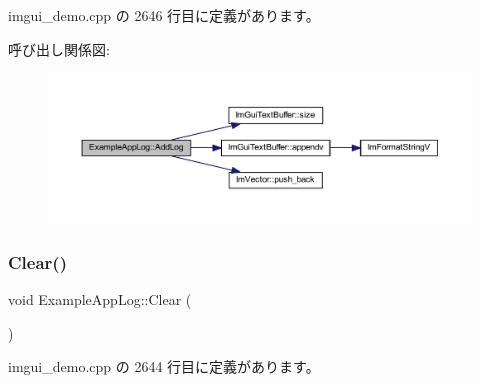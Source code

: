  imgui\+\_\+demo.\+cpp の 2646 行目に定義があります。

呼び出し関係図\+:\nopagebreak
\begin{figure}[H]
\begin{center}
\leavevmode
\includegraphics[width=350pt]{struct_example_app_log_afd296fb3b2559acd341fd92883f8f571_cgraph}
\end{center}
\end{figure}
\mbox{\label{struct_example_app_log_ab9c298defddbb106fdfe4ab16c5eebac}} 
\subsubsection{\texorpdfstring{Clear()}{Clear()}}
{\footnotesize\ttfamily void Example\+App\+Log\+::\+Clear (\begin{DoxyParamCaption}{ }\end{DoxyParamCaption})\hspace{0.3cm}{\ttfamily [inline]}}



 imgui\+\_\+demo.\+cpp の 2644 行目に定義があります。


